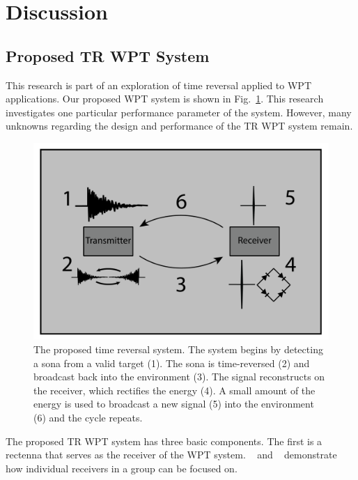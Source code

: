 \section{Discussion}

\subsection{Proposed TR WPT System}
\label{sec:WPTSys}

This research is part of an exploration of time reversal applied to WPT applications. Our proposed WPT system is shown in Fig.~\ref{fig:SysImage}. This research investigates one particular performance parameter of the system. However, many unknowns regarding the design and performance of the TR WPT system remain.

\begin{figure}[t!]
\includegraphics[width=\columnwidth]{figs/WPTSys.png}
\caption{The proposed time reversal system. The system begins by detecting a sona from a valid target (1). The sona is time-reversed (2) and broadcast back into the environment (3). The signal reconstructs on the receiver, which rectifies the energy (4).  A small amount of the energy is used to broadcast a new signal (5) into the environment (6) and the cycle repeats.}
\label{fig:SysImage}
\end{figure}


The proposed TR WPT system has three basic components. The first is a rectenna that serves as the receiver of the WPT system. ~\cite{nltr-wave-chaotic} and ~\cite{ROMAN}  demonstrate how individual receivers in a group can be focused on.

